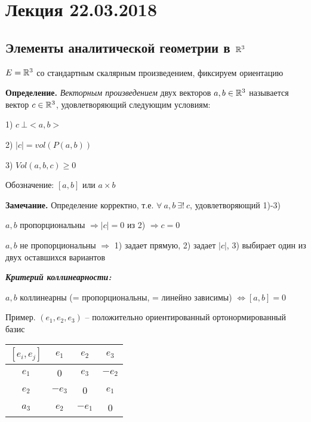 \section{Лекция 22.03.2018}

\subsection{Элементы аналитической геометрии в $\mathbb{R}^3$}

$E =\mathbb{R}^3$ со стандартным скалярным произведением, фиксируем ориентацию 

\vspace{\baselineskip}
\textbf{Определение.} \textit{Векторным произведением} двух векторов $a, b \in \mathbb{R}^3$ называется вектор $c \in \mathbb{R}^3$, удовлетворяющий следующим условиям:

1) $c \ \bot <a, b>$

2) $|c| = vol (P(a, b))$

3) $Vol(a, b, c) \geq 0$

Обозначение: $[a, b]$ или $a \times b$

\vspace{\baselineskip}
\textbf{Замечание.} Определение корректно, т.е. $\forall \ a, b \ \exists! \ c$,  удовлетворяющий 1)-3)

$a, b$ пропорциональны $\Rightarrow |c| = 0$ из 2) $\Rightarrow c = 0$

$a, b$ не пропорциональны $\Rightarrow$ 1) задает прямую, 2) задает $|c|$, 3) выбирает один из двух оставшихся вариантов

\vspace{\baselineskip}
\textbf{\textit{Критерий коллинеарности:}}

$a, b$ коллинеарны (= пропорциональны, = линейно зависимы) $\Leftrightarrow [a, b] = 0$

\vspace{\baselineskip}
Пример. $(e_1, e_2, e_3)$ -- положительно ориентированный ортонормированный базис

\vspace{\baselineskip}
\begin{tabular}{c|c|c|c}
$[e_i, e_j]$ & $e_1$ & $e_2$ & $e_3$ \\
\hline
$e_1$ & 0 & $e_3$ & $-e_2$  \\
\hline
$e_2$ & $-e_3$ & 0 & $e_1$   \\
\hline
$a_3$ & $e_2$ & $-e_1$ & 0   \\
\hline
\end{tabular}

